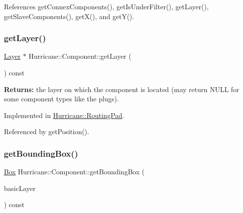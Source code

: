 References get\+Connex\+Components(), get\+Is\+Under\+Filter(), get\+Layer(), get\+Slave\+Components(), get\+X(), and get\+Y().

\mbox{\label{classHurricane_1_1Component_ab451ef19059e6e5bbb77ae391d02a039}} 
\subsubsection{\texorpdfstring{get\+Layer()}{getLayer()}}
{\footnotesize\ttfamily \hyperlink{classHurricane_1_1Layer}{Layer} $\ast$ Hurricane\+::\+Component\+::get\+Layer (\begin{DoxyParamCaption}{ }\end{DoxyParamCaption}) const\hspace{0.3cm}{\ttfamily [pure virtual]}}

{\bfseries Returns\+:} the layer on which the component is located (may return N\+U\+LL for some component types like the plugs). 

Implemented in \hyperlink{classHurricane_1_1RoutingPad_a7f1e300e4148556fa223e623738d79d4}{Hurricane\+::\+Routing\+Pad}.



Referenced by get\+Position().

\mbox{\label{classHurricane_1_1Component_a69d527dbfda1cb58cdca27c6ac3f7796}} 
\subsubsection{\texorpdfstring{get\+Bounding\+Box()}{getBoundingBox()}}
{\footnotesize\ttfamily \hyperlink{classHurricane_1_1Box}{Box} Hurricane\+::\+Component\+::get\+Bounding\+Box (\begin{DoxyParamCaption}\item[{const \hyperlink{classHurricane_1_1BasicLayer}{Basic\+Layer} $\ast$}]{basic\+Layer }\end{DoxyParamCaption}) const\hspace{0.3cm}{\ttfamily [pure virtual]}}

